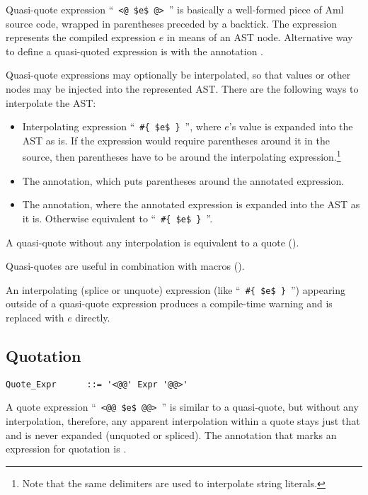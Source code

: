 Quasi-quote expression ``~\lstinline!<@ $e$ @>!~'' is basically a well-formed piece of Aml source code, wrapped in parentheses preceded by a backtick. The expression represents the compiled expression $e$ in means of an AST node. Alternative way to define a quasi-quoted expression is with the annotation .

Quasi-quote expressions may optionally be interpolated, so that values or other nodes may be injected into the represented AST. There are the following ways to interpolate the AST:
\begin{itemize}
  \item Interpolating expression ``~\lstinline!#{ $e$ }!~'', where $e$'s value is expanded into the AST as is. If the expression would require parentheses around it in the source, then parentheses have to be around the interpolating expression.\footnote{Note that the same delimiters are used to interpolate string literals.}
  \item The  annotation, which puts parentheses around the annotated expression.
  \item The  annotation, where the annotated expression is expanded into the AST as it is. Otherwise equivalent to ``~\lstinline!#{ $e$ }!~''.
\end{itemize}

A quasi-quote without any interpolation is equivalent to a quote (). 

Quasi-quotes are useful in combination with macros (). 

An interpolating (splice or unquote) expression (like ``~\lstinline!#{ $e$ }!~'') appearing outside of a quasi-quote expression produces a compile-time warning and is replaced with $e$ directly. 





\subsection{Quotation}
\label{sec:quotation}

\grammar\begin{lstlisting}
Quote_Expr      ::= '<@@' Expr '@@>'
\end{lstlisting}

A quote expression ``~\lstinline!<@@ $e$ @@>!~'' is similar to a quasi-quote, but without any interpolation, therefore, any apparent interpolation within a quote stays just that and is never expanded (unquoted or spliced). The annotation that marks an expression for quotation is . 





